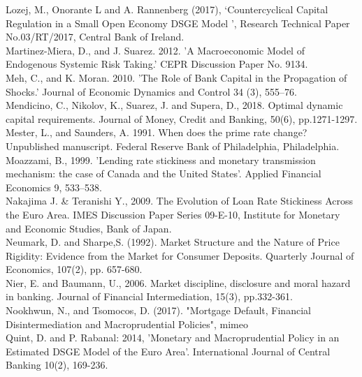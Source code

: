 \documentclass[12pt]{article}
\numberwithin{equation}{section}
\begin{document}
Lozej, M., Onorante L and A. Rannenberg (2017), ‘Countercyclical Capital Regulation
in a Small Open Economy DSGE Model
’, Research Technical Paper No.03/RT/2017, Central Bank of Ireland.\\

Martinez-Miera, D., and J. Suarez. 2012. 'A Macroeconomic Model
of Endogenous Systemic Risk Taking.' CEPR Discussion Paper
No. 9134.\\

Meh, C., and K. Moran. 2010. 'The Role of Bank Capital in the
Propagation of Shocks.' Journal of Economic Dynamics and
Control 34 (3), 555–76.\\

Mendicino, C., Nikolov, K., Suarez, J. and Supera, D., 2018. Optimal dynamic capital requirements. Journal of Money, Credit and Banking, 50(6), pp.1271-1297.\\


Mester, L., and Saunders, A. 1991. When does the prime rate change? Unpublished manuscript. Federal Reserve Bank of Philadelphia, Philadelphia.\\


Moazzami, B., 1999. 'Lending rate stickiness and monetary transmission mechanism: the case of Canada and the United States'.
Applied Financial Economics 9, 533–538.\\


Nakajima J. \& Teranishi Y., 2009. The Evolution of Loan Rate Stickiness Across the Euro Area. IMES Discussion Paper Series 09-E-10, Institute for Monetary and Economic Studies, Bank of Japan.\\


Neumark, D. and  Sharpe,S. (1992). Market Structure and the Nature of Price
Rigidity: Evidence from the Market for Consumer Deposits. Quarterly Journal of
Economics, 107(2), pp. 657-680.\\

Nier, E. and Baumann, U., 2006. Market discipline, disclosure and moral hazard in banking. Journal of Financial Intermediation, 15(3), pp.332-361. \\

Nookhwun, N., and Tsomocos, D. (2017). "Mortgage Default, Financial Disintermediation and
Macroprudential Policies", mimeo
\\




Quint, D. and P. Rabanal: 2014, 'Monetary and Macroprudential Policy in an Estimated
DSGE Model of the Euro Area'. International Journal of Central Banking
10(2), 169-236.\\
\end{document}
